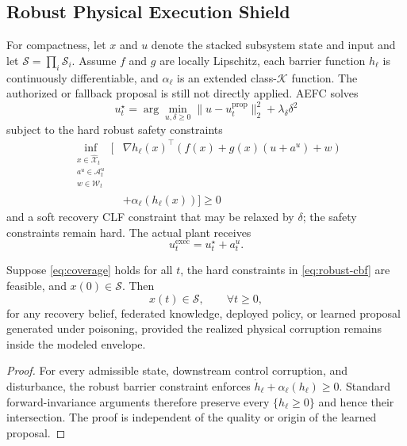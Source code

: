 \subsection{Robust Physical Execution Shield}
For compactness, let $x$ and $u$ denote the stacked subsystem state and input and let $\mathcal S=\prod_i\mathcal S_i$. Assume $f$ and $g$ are locally Lipschitz, each barrier function $h_\ell$ is continuously differentiable, and $\alpha_\ell$ is an extended class-$\mathcal K$ function. The authorized or fallback proposal is still not directly applied. AEFC solves
\begin{equation}
u_t^\star=
\arg\min_{u,\delta\ge0}
\|u-u_t^{\mathrm{prop}}\|_2^2+\lambda_\delta\delta^2
\label{eq:shield-new}
\end{equation}
subject to the hard robust safety constraints
\begin{align}
\inf_{\substack{x\in\widehat{\mathcal X}_t\\
a^u\in\mathcal A_t^u\\
w\in\mathcal W_t}}
\Big[&\nabla h_\ell(x)^\top(f(x)+g(x)(u+a^u)+w) \nonumber\\
&+\alpha_\ell(h_\ell(x))\Big]\ge0
\label{eq:robust-cbf}
\end{align}
and a soft recovery CLF constraint that may be relaxed by $\delta$; the safety constraints remain hard. The actual plant receives
\begin{equation}
u_t^{\mathrm{exec}}=u_t^\star+a_t^u.
\end{equation}

\begin{theorem}
Suppose \eqref{eq:coverage} holds for all $t$, the hard constraints in \eqref{eq:robust-cbf} are feasible, and $x(0)\in\mathcal S$. Then
\begin{equation}
x(t)\in\mathcal S,\qquad \forall t\ge0,
\end{equation}
for any recovery belief, federated knowledge, deployed policy, or learned proposal generated under poisoning, provided the realized physical corruption remains inside the modeled envelope.
\end{theorem}
\begin{proof}
For every admissible state, downstream control corruption, and disturbance, the robust barrier constraint enforces
$\dot h_\ell+\alpha_\ell(h_\ell)\ge0$.
Standard forward-invariance arguments therefore preserve every
$\{h_\ell\ge0\}$ and hence their intersection. The proof is independent of the quality or origin of the learned proposal.
\end{proof}

